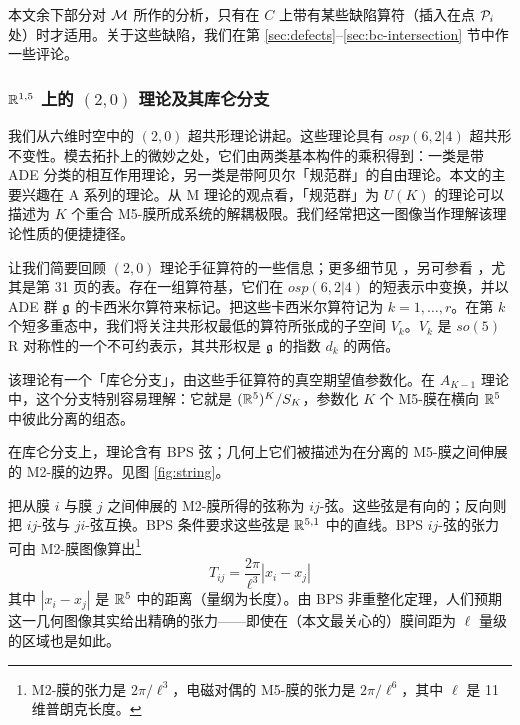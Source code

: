 本文余下部分对 $\mathcal{M}$ 所作的分析，只有在 $C$ 上带有某些缺陷算符（插入在点 $\mathcal{P}_i$ 处）时才适用。关于这些缺陷，我们在第 \ref{sec:defects}–\ref{sec:bc-intersection} 节中作一些评论。

\subsubsection{$\mathbb{R}^{1,5}$ 上的 $(2,0)$ 理论及其库仑分支}\label{subsubsec:20AndCoulomb}

我们从六维时空中的 $(2,0)$ 超共形理论讲起\cite{Witten:1995zh,Strominger:1996ac,Witten:1995em,Seiberg:1996vs,Seiberg:1997ax,Seiberg:1997zk}。这些理论具有 $osp(6,2\vert 4)$ 超共形不变性。模去拓扑上的微妙之处，它们由两类基本构件的乘积得到：一类是带 ADE 分类的相互作用理论，另一类是带阿贝尔「规范群」的自由理论。本文的主要兴趣在 A 系列的理论。从 M 理论的观点看，「规范群」为 $U(K)$ 的理论可以描述为 $K$ 个重合 M5-膜所成系统的解耦极限\cite{Strominger:1996ac}。我们经常把这一图像当作理解该理论性质的便捷捷径。

让我们简要回顾 $(2,0)$ 理论手征算符的一些信息；更多细节见 \cite{Aharony:1998an}，另可参看 \cite{Bhattacharya:2008zy}，尤其是第 31 页的表。存在一组算符基，它们在 $osp(6,2\vert 4)$ 的短表示中变换，并以 ADE 群 ${\mathfrak{g}}$ 的卡西米尔算符来标记。把这些卡西米尔算符记为 $k=1, \dots, r$。在第 $k$ 个短多重态中，我们将关注共形权最低的算符所张成的子空间 $V_k$。$V_k$ 是 $so(5)$ R 对称性的一个不可约表示，其共形权是 ${\mathfrak{g}}$ 的指数 $d_k$ 的两倍。

该理论有一个「库仑分支」，由这些手征算符的真空期望值参数化。在 $A_{K-1}$ 理论中，这个分支特别容易理解：它就是 $(\mathbb{R}^5)^K / S_K$，参数化 $K$ 个 M5-膜在横向 $\mathbb{R}^5$ 中彼此分离的组态。

在库仑分支上，理论含有 BPS 弦；几何上它们被描述为在分离的 M5-膜之间伸展的 M2-膜的边界。见图 \ref{fig:string}。


把从膜 $i$ 与膜 $j$ 之间伸展的 M2-膜所得的弦称为 $ij$-弦。这些弦是有向的；反向则把 $ij$-弦与 $ji$-弦互换。BPS 条件要求这些弦是 $\mathbb{R}^{5,1}$ 中的直线。BPS $ij$-弦的张力可由 M2-膜图像算出\footnote{M2-膜的张力是 $2\pi/\ell^3$，电磁对偶的 M5-膜的张力是 $2\pi/\ell^6$，其中 $\ell$ 是 11 维普朗克长度。}
\begin{equation}
T_{ij} = \frac{2 \pi}{\ell^3} |x_i-x_j|
\end{equation}
其中 $|x_i-x_j|$ 是 $\mathbb{R}^5$ 中的距离（量纲为长度）。由 BPS 非重整化定理，人们预期这一几何图像其实给出精确的张力——即使在（本文最关心的）膜间距为 $\ell$ 量级的区域也是如此。

